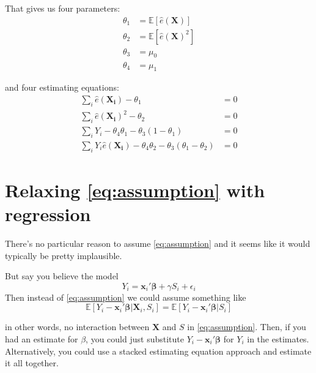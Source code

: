 \documentclass[11pt]{article} %
\newcommand{\EE}{\mathbb{E}}
\newcommand{\hpp}{\hat{e}(\bm{X})}
\newcommand{\hppi}{\hat{e}(\bm{X_i})}
\begin{document}
That gives us four parameters:
\begin{align*}
  \theta_1&=\EE[\hpp]\\
  \theta_2&=\EE[\hpp^2]\\
  \theta_3&=\mu_0\\
  \theta_4&=\mu_1
\end{align*}

and four estimating equations:
\begin{align*}
  \sum_i \hppi-\theta_1&=0\\
  \sum_i \hppi^2-\theta_2&=0\\
  \sum_i Y_i-\theta_4\theta_1-\theta_3(1-\theta_1)&=0\\
  \sum_i Y_i\hppi-\theta_4\theta_2-\theta_3(\theta_1-\theta_2)&=0
\end{align*}


\section{Relaxing \eqref{eq:assumption} with regression}
There's no particular reason to assume \eqref{eq:assumption} and it seems like it would typically be pretty implausible. 

But say you believe the model
\begin{equation}\label{eq:regression}
Y_i=\bm{x}_i'\bm{\beta}+\gamma S_i+\epsilon_i
\end{equation}
 Then instead of \eqref{eq:assumption} we could assume something like
\begin{equation*}
\EE[Y_i-\bm{x}_i'\bm{\beta}|\bm{X}_i,S_i]=\EE[Y_i-\bm{x}_i'\bm{\beta}|S_i]
\end{equation*}

in other words, no interaction between $\bm{X}$ and $S$ in \eqref{eq:assumption}. 
Then, if you had an estimate for $\beta$, you could just substitute $Y_i-\bm{x}_i'\bm{\beta}$ for $Y_i$ in the estimates. 
Alternatively, you could use a stacked estimating equation approach and estimate it all together.



\end{document}
